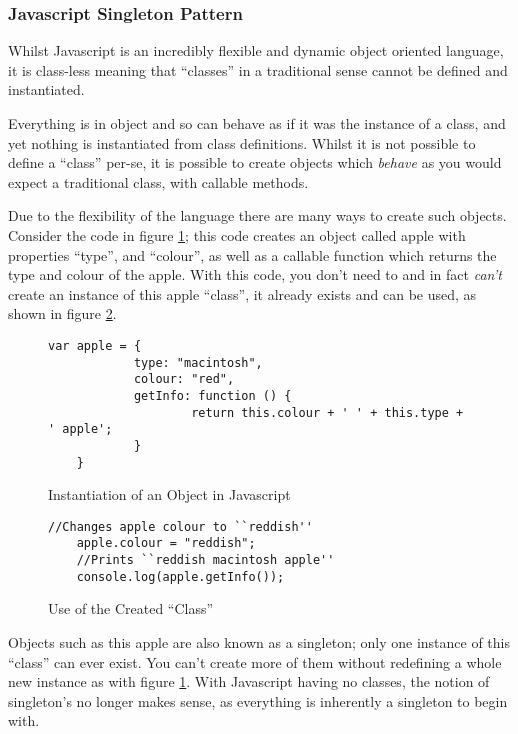 \subsubsection{Javascript Singleton Pattern}
\label{subsubs:jsSingleton}

\FloatBarrier

Whilst Javascript is an incredibly flexible and dynamic object oriented language, it is class-less meaning that ``classes'' in a traditional sense cannot be defined and instantiated.

Everything is in object and so can behave as if it was the instance of a class, and yet nothing is instantiated from class definitions.  Whilst it is not possible to define a ``class'' per-se, it is possible to create objects which \textit{behave} as you would expect a traditional class, with callable methods\cite{jsClasses}.

Due to the flexibility of the language there are many ways to create such objects.  Consider the code in figure \ref{fig:jsObjectInst};  this code creates an object called apple with properties ``type'', and ``colour'', as well as a callable function which returns the type and colour of the apple.  With this code, you don't need to and in fact \textit{can't} create an instance of this apple ``class'', it already exists and can be used, as shown in figure \ref{fig:usingAppleClass}.

\begin{figure}
\lstset{language=JavaScript}
\begin{lstlisting}[tabsize=2,breaklines=true]
	var apple = {
			type: "macintosh",
			colour: "red",
			getInfo: function () {
					return this.colour + ' ' + this.type + ' apple';
			}
	}
	\end{lstlisting}
	\caption{Instantiation of an Object in Javascript}
	\label{fig:jsObjectInst}
\end{figure}

\begin{figure}
\lstset{language=JavaScript}
\begin{lstlisting}[tabsize=2,breaklines=true]
	//Changes apple colour to ``reddish''
	apple.colour = "reddish";
	//Prints ``reddish macintosh apple''
	console.log(apple.getInfo());
	\end{lstlisting}
	\caption{Use of the Created ``Class''}
	\label{fig:usingAppleClass}
\end{figure}

Objects such as this apple are also known as a singleton; only one instance of this ``class'' can ever exist.  You can't create more of them without redefining a whole new instance as with figure \ref{fig:jsObjectInst}.  With Javascript having no classes, the notion of singleton's no longer makes sense, as everything is inherently a singleton to begin with.

